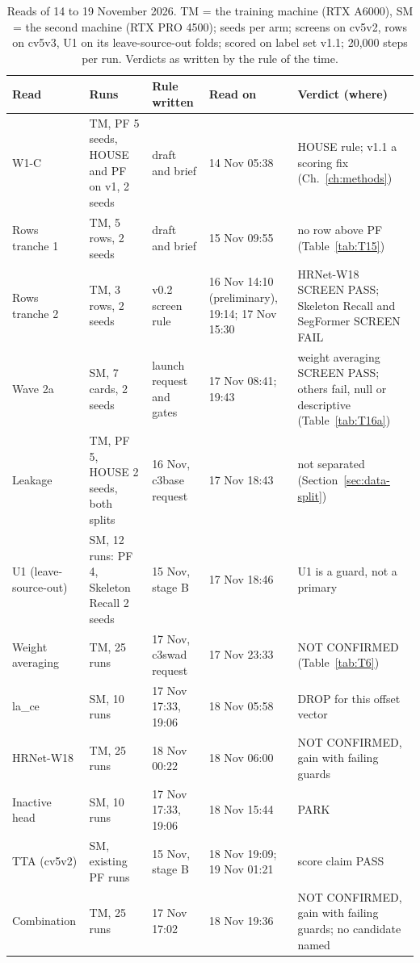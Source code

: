 \begin{table}[htbp]
\centering
\small
\caption{Reads of 14 to 19 November 2026. TM = the training machine (RTX A6000), SM = the second machine (RTX PRO 4500); seeds
per arm; screens on cv5v2, rows on cv5v3, U1 on its leave-source-out folds; scored on label set v1.1; 20,000 steps per run. Verdicts as written by the rule of the time.}
\label{tab:build-reads}
\begin{tabular}{@{}p{2.5cm}p{2.4cm}p{2.8cm}p{2.0cm}p{4.0cm}@{}}
\toprule
Read & Runs & Rule written & Read on & Verdict (where) \\
\midrule
W1-C & TM, PF 5 seeds, HOUSE and PF on v1, 2 seeds & draft and brief & 14 Nov 05:38 & HOUSE rule; v1.1 a scoring fix
(Ch.~\ref{ch:methods}) \\
Rows tranche 1 & TM, 5 rows, 2 seeds & draft and brief & 15 Nov 09:55 & no row above PF (Table~\ref{tab:T15}) \\
Rows tranche 2 & TM, 3 rows, 2 seeds & v0.2 screen rule & 16 Nov 14:10 (preliminary), 19:14; 17 Nov 15:30 & HRNet-W18 SCREEN PASS; Skeleton Recall
and SegFormer SCREEN FAIL \\
Wave 2a & SM, 7 cards, 2 seeds & launch request and gates & 17 Nov 08:41; 19:43 & weight averaging SCREEN PASS; others fail,
null or descriptive (Table~\ref{tab:T16a}) \\
Leakage & TM, PF 5, HOUSE 2 seeds, both splits & 16 Nov, c3base request & 17 Nov 18:43 & not separated
(Section~\ref{sec:data-split}) \\
U1 (leave-source-out) & SM, 12 runs: PF 4, Skeleton Recall 2 seeds & 15 Nov, stage B & 17 Nov 18:46 & U1 is a guard, not a
primary \\
Weight averaging & TM, 25 runs & 17 Nov, c3swad request & 17 Nov 23:33 & NOT CONFIRMED (Table~\ref{tab:T6}) \\
la\_ce & SM, 10 runs & 17 Nov 17:33, 19:06 & 18 Nov 05:58 & DROP for this offset vector \\
HRNet-W18 & TM, 25 runs & 18 Nov 00:22 & 18 Nov 06:00 & NOT CONFIRMED, gain with failing guards \\
Inactive head & SM, 10 runs & 17 Nov 17:33, 19:06 & 18 Nov 15:44 & PARK \\
TTA (cv5v2) & SM, existing PF runs & 15 Nov, stage B & 18 Nov 19:09; 19 Nov 01:21 & score claim PASS \\
Combination & TM, 25 runs & 17 Nov 17:02 & 18 Nov 19:36 & NOT CONFIRMED, gain with failing guards; no candidate named \\
\bottomrule
\end{tabular}
\end{table}

